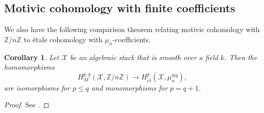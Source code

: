 \documentclass[10pt]{amsart}
\theoremstyle{plain}
\newtheorem{corollary}[thm]{Corollary}
\theoremstyle{definition}
\newcommand{\sX}{{\mathcal X}}
\newcommand{\Z}{{\mathbb Z}}
\newcommand{\DM}[2]{\mathbf{DM}_{#2}^{\mathit{eff}}(#1)}
\begin{document}





\subsection{Motivic cohomology with finite coefficients} We also have the following comparison theorem relating motivic cohomology with $\Z/n\Z$ to \'{e}tale cohomology with $\mu_n$-coefficients.
\begin{corollary}\label{corollary-bl}
	Let $\sX$ be an algebraic stack that is smooth over a field $k$. Then the homomorphisms
	\[H^{p,q}_M (\sX,\Z/n\Z)\rightarrow H^p_{\acute{e}t}(\sX,\mu_n^{\otimes q}),\]
	are isomorphisms for $p\leq q$ and monomorphisms for $p=q+1$.
\end{corollary}
\begin{proof}
	See \cite[Corollary 5.3]{cdh20}.
\end{proof}
\end{document}
